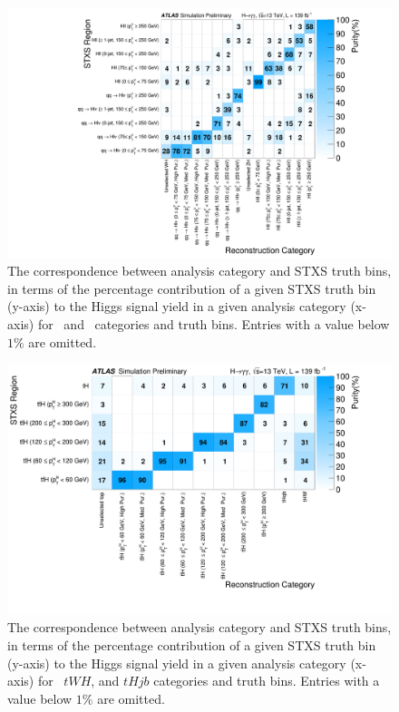 \begin{figure}[h]
\centering
\includegraphics[width=1.09\textwidth]{figures/couplings_chapter/purity_2D_subplots_3}
\caption{The correspondence between analysis category and STXS truth bins, in terms of the percentage contribution of a given STXS truth bin (y-axis) to the Higgs signal yield in a given analysis category (x-axis) for \qqtoHll\ and \qqtoHln\ categories and truth bins. Entries with a value below $1\%$ are omitted.}
\label{fig:yields_3}
\end{figure}


\begin{figure}[h]
\centering
\includegraphics[width=1.09\textwidth]{figures/couplings_chapter/purity_2D_subplots_4}
\caption{The correspondence between analysis category and STXS truth bins, in terms of the percentage contribution of a given STXS truth bin (y-axis) to the Higgs signal yield in a given analysis category (x-axis) for \ttH\, $tWH$, and $tHjb$ categories and truth bins. Entries with a value below $1\%$ are omitted.}
\label{fig:yields_4}
\end{figure}


